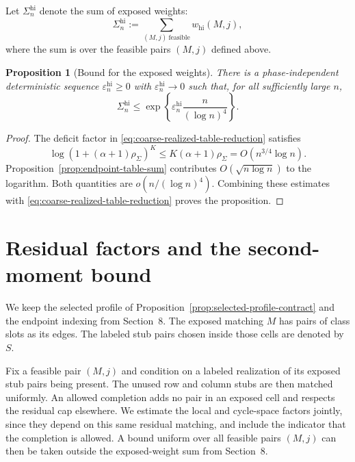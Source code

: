 \documentclass[a4paper,10pt,reqno]{amsart}
\numberwithin{equation}{section}
\theoremstyle{plain}
\newtheorem{proposition}[theorem]{Proposition}
\theoremstyle{remark}
\begin{document}
Let $\Sigma_n^{\mathrm{hi}}$ denote the sum of exposed weights:
\[
  \Sigma_n^{\mathrm{hi}}
  :=
  \sum_{(M,j)\ \mathrm{feasible}}w_{\mathrm{hi}}(M,j),
\]
where the sum is over the feasible pairs $(M,j)$ defined above.

\begin{proposition}[Bound for the exposed weights]
\label{prop:bare-high-skeleton}
There is a phase-independent deterministic sequence
$\varepsilon_n^{\mathrm{hi}}\ge0$ with
$\varepsilon_n^{\mathrm{hi}}\to0$ such that, for all sufficiently large $n$,
\begin{equation}
  \Sigma_n^{\mathrm{hi}}
  \le
  \exp\!\left\{
    \varepsilon_n^{\mathrm{hi}}\frac{n}{(\log n)^4}
  \right\}.
  \label{eq:bare-skeleton-final}
\end{equation}
\end{proposition}

\begin{proof}
The deficit factor in \eqref{eq:coarse-realized-table-reduction} satisfies
\[
  \log\left(1+(\alpha+1)\rho_{\Sigma}\right)^K
  \le
  K(\alpha+1)\rho_{\Sigma}
  =O(n^{3/4}\log n).
\]
Proposition~\ref{prop:endpoint-table-sum} contributes
$O(\sqrt{n\log n})$ to the logarithm. Both quantities are
$o(n/(\log n)^4)$. Combining these estimates with
\eqref{eq:coarse-realized-table-reduction} proves the proposition.
\end{proof}

\section{Residual factors and the second-moment bound}
\label{sec:residual-attachments}

We keep the selected profile of Proposition~\ref{prop:selected-profile-contract}
and the endpoint indexing from Section~8. The exposed matching \(M\)
has pairs of class slots as its edges. The labeled stub pairs chosen
inside those cells are denoted by \(S\).

Fix a feasible pair $(M,j)$ and condition on a labeled realization of its
exposed stub pairs being present. The unused row and column stubs are then
matched uniformly. An allowed completion adds no pair in an exposed cell
and respects the residual cap elsewhere. We estimate the local and
cycle-space factors jointly, since they depend on this same residual
matching, and include the indicator that the completion is allowed.
A bound uniform over all feasible pairs $(M,j)$ can then be taken outside
the exposed-weight sum from Section~8.
\end{document}
